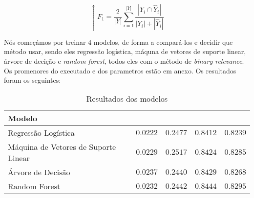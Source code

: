 \documentclass[justified, 11pt]{scrartcl}
\begin{document}
  $$
  \uparrow F_1 = \frac{2}{|Y|} \sum_{i=1}^{|Y|} 
    \frac{\left| Y_i \cap \hat{Y}_i \right|}{| Y_i | + | \hat{Y}_i |}
  $$

  
  Nós começámos por treinar 4 modelos, de forma a compará-los e decidir que método usar, sendo eles regressão logística, máquna de vetores de suporte linear, árvore de decição e \textit{random forest}, todos eles com o método de \textit{binary relevance}. Os promenores do executado e dos parametros estão em anexo. Os resultados foram os seguintes:
  \begin{table}[H]
    \centering
    \caption{Resultados dos modelos}
    \setlength{\extrarowheight}{0pt}
    \begin{tabulary}{\textwidth}{ L|r r r r }
      Modelo &  &  &  &  \\ \hline
      Regressão Logística & $0.0222$ & $0.2477$ & $0.8412$ & $0.8239$ \\
      Máquina de Vetores de Suporte Linear & $0.0229$ & $0.2517$ & $0.8424$ & $0.8285$ \\
      Árvore de Decisão & $\boldsymbol{0.0237}$ & $\boldsymbol{0.2440}$ & $0.8429$ & $0.8268$ \\
      Random Forest & $0.0232$ & $0.2442$ & $\boldsymbol{0.8444}$ & $\boldsymbol{0.8295}$ \\
    \end{tabulary}
    \label{tab:results}
  \end{table}
  
\end{document}
